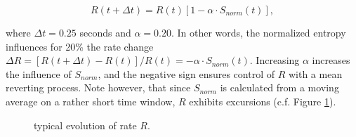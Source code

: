 \begin{equation}
R(t+\Delta t) = R(t) \left[1 - \alpha \cdot S_{norm}(t)\right],
\label{eq:RateChange}
\end{equation}

where $\Delta t = 0.25$ seconds and $\alpha = 0.20$. In other words, the normalized entropy influences for 20\% the rate change $\Delta R =  \left[ R(t+\Delta t) - R(t) \right] / R(t) = - \alpha \cdot S_{norm}(t)$. Increasing $\alpha$ increases the influence of $S_{norm}$, and the negative sign ensures control of $R$ with a mean reverting process. Note however, that since $S_{norm}$ is calculated from a moving average on a rather short time window, $R$ exhibits excursions (c.f. Figure \ref{fig:trajectory}).

\begin{figure}[!t]
\centering
\caption{typical evolution of rate $R$.}
\label{fig:trajectory}
\end{figure}
